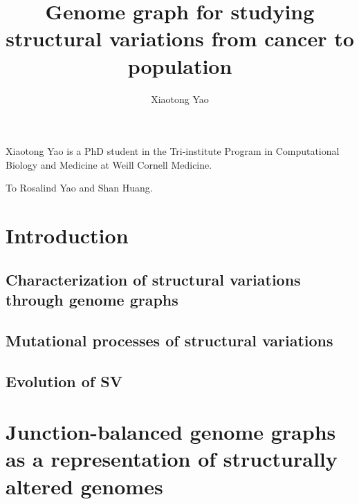 \documentclass[phd,tocprelim]{cornell}
\title{Genome graph for studying structural variations from cancer to population}
\author {Xiaotong Yao}
\begin{document}
\maketitle
\makecopyright

\begin{abstract}

\end{abstract}

\begin{biosketch}
Xiaotong Yao is a PhD student in the Tri-institute Program in Computational Biology and Medicine at Weill Cornell Medicine.
\end{biosketch}

\begin{dedication}
To Rosalind Yao and Shan Huang.
\end{dedication}


\contentspage
\tablelistpage
\figurelistpage

\normalspacing \setcounter{page}{1} 
\pagestyle{cornell} \addtolength{\parskip}{0.5\baselineskip}

\chapter{Introduction}

\section{Characterization of structural variations through genome graphs}

\section{Mutational processes of structural variations}

\section{Evolution of SV}

\chapter{Junction-balanced genome graphs as a representation of structurally altered genomes}
\end{document}
